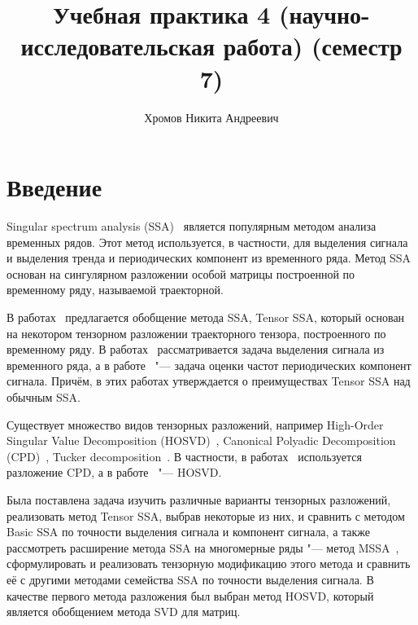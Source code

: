 \documentclass[specialist,
    substylefile = spbu_report.rtx,
    subf,href,colorlinks=true, 12pt]{disser}
\theoremstyle{plain}
\theoremstyle{definition}
\theoremstyle{remark}
\begin{document}
    \title{Учебная практика 4 (научно-исследовательская работа) (семестр 7)}
    \author{Хромов Никита Андреевич}
    \date{\number\year}
    \maketitle

    \tableofcontents


    \section{Введение}\label{sec:intro}
    Singular spectrum analysis (SSA)~\cite{ssa} является популярным методом анализа временных рядов.
    Этот метод используется, в частности, для выделения сигнала и выделения тренда и периодических компонент из временного ряда.
    Метод SSA основан на сингулярном разложении особой матрицы построенной по временному ряду, называемой траекторной.

    В работах~\cite{TSSA, TSSA-improved, hosvd-hooi-separation} предлагается обобщение метода SSA, Tensor SSA, который основан на некотором
    тензорном разложении траекторного тензора, построенного по временному ряду.
    В работах~\cite{TSSA, TSSA-improved} рассматривается задача выделения сигнала из временного ряда,
    а в работе~\cite{hosvd-hooi-separation} "--- задача оценки частот периодических компонент сигнала.
    Причём, в этих работах утверждается о преимуществах Tensor SSA над обычным SSA\@.

    Существует множество видов тензорных разложений, например High-Order Singular Value Decomposition (HOSVD)~\cite{hosvd},
    Canonical Polyadic Decomposition (CPD)~\cite{parafac1, parafac2}, Tucker decomposition~\cite{tucker}.
    В частности, в работах~\cite{TSSA, TSSA-improved} используется разложение CPD, а в
    работе~\cite{hosvd-hooi-separation} "--- HOSVD\@.

    Была поставлена задача изучить различные варианты тензорных разложений, реализовать метод Tensor SSA, выбрав некоторые из них,
    и сравнить с методом Basic SSA по точности выделения сигнала и компонент сигнала, а также
    рассмотреть расширение метода SSA на многомерные ряды "--- метод MSSA~\cite{ssa-2020},
    сформулировать и реализовать тензорную модификацию этого метода и сравнить её с другими методами
    семейства SSA по точности выделения сигнала.
    В качестве первого метода разложения был выбран метод HOSVD, который является обобщением метода SVD для матриц.
\end{document}
